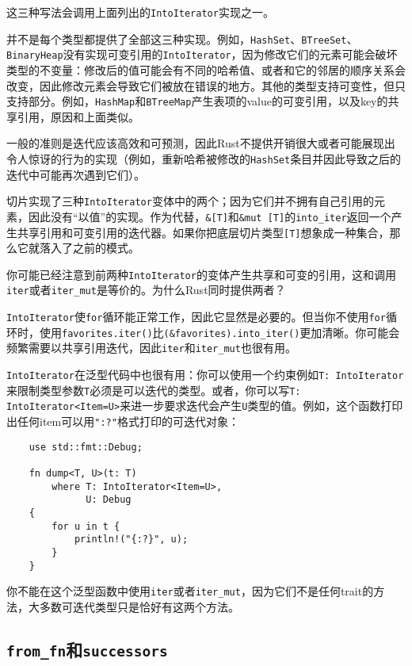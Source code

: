 这三种写法会调用上面列出的\texttt{IntoIterator}实现之一。

并不是每个类型都提供了全部这三种实现。例如，\texttt{HashSet}、\texttt{BTreeSet}、\texttt{BinaryHeap}没有实现可变引用的\texttt{IntoIterator}，因为修改它们的元素可能会破坏类型的不变量：修改后的值可能会有不同的哈希值、或者和它的邻居的顺序关系会改变，因此修改元素会导致它们被放在错误的地方。其他的类型支持可变性，但只支持部分。例如，\texttt{HashMap}和\texttt{BTreeMap}产生表项的value的可变引用，以及key的共享引用，原因和上面类似。

一般的准则是迭代应该高效和可预测，因此Rust不提供开销很大或者可能展现出令人惊讶的行为的实现（例如，重新哈希被修改的\texttt{HashSet}条目并因此导致之后的迭代中可能再次遇到它们）。

切片实现了三种\texttt{IntoIterator}变体中的两个；因为它们并不拥有自己引用的元素，因此没有“以值”的实现。作为代替，\texttt{\&[T]}和\texttt{\&mut [T]}的\texttt{into\_iter}返回一个产生共享引用和可变引用的迭代器。如果你把底层切片类型\texttt{[T]}想象成一种集合，那么它就落入了之前的模式。

你可能已经注意到前两种\texttt{IntoIterator}的变体产生共享和可变的引用，这和调用\texttt{iter}或者\texttt{iter\_mut}是等价的。为什么Rust同时提供两者？

\texttt{IntoIterator}使\texttt{for}循环能正常工作，因此它显然是必要的。但当你不使用\texttt{for}循环时，使用\texttt{favorites.iter()}比\texttt{(\&favorites).into\_iter()}更加清晰。你可能会频繁需要以共享引用迭代，因此\texttt{iter}和\texttt{iter\_mut}也很有用。

\texttt{IntoIterator}在泛型代码中也很有用：你可以使用一个约束例如\texttt{T: IntoIterator}来限制类型参数\texttt{T}必须是可以迭代的类型。或者，你可以写\texttt{T: IntoIterator<Item=U>}来进一步要求迭代会产生\texttt{U}类型的值。例如，这个函数打印出任何item可以用\texttt{"{:?}"}格式打印的可迭代对象：
\begin{verbatim}
    use std::fmt::Debug;

    fn dump<T, U>(t: T)
        where T: IntoIterator<Item=U>,
              U: Debug
    {
        for u in t {
            println!("{:?}", u);
        }
    }
\end{verbatim}
你不能在这个泛型函数中使用\texttt{iter}或者\texttt{iter\_mut}，因为它们不是任何trait的方法，大多数可迭代类型只是恰好有这两个方法。

\subsection{\texttt{from\_fn}和\texttt{successors}}

